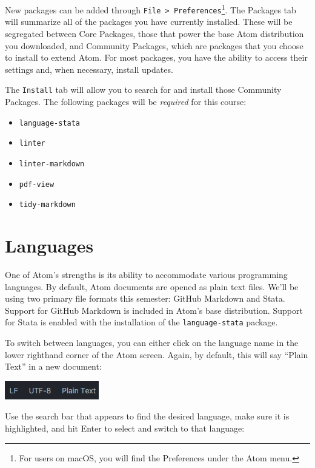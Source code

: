 \documentclass[]{book}
\providecommand{\tightlist}{%
  \setlength{\itemsep}{0pt}\setlength{\parskip}{0pt}}
\let\rmarkdownfootnote\footnote%
\def\footnote{\protect\rmarkdownfootnote}
\theoremstyle{definition}
\theoremstyle{definition}
\theoremstyle{remark}
\begin{document}
New packages can be added through
\texttt{File\ \textgreater{}\ Preferences}\footnote{For users on macOS,
  you will find the Preferences under the Atom menu.}. The Packages tab
will summarize all of the packages you have currently installed. These
will be segregated between Core Packages, those that power the base Atom
distribution you downloaded, and Community Packages, which are packages
that you choose to install to extend Atom. For most packages, you have
the ability to access their settings and, when necessary, install
updates.

The \texttt{Install} tab will allow you to search for and install those
Community Packages. The following packages will be \emph{required} for
this course:

\begin{itemize}
\tightlist
\item
  \texttt{language-stata}
\item
  \texttt{linter}
\item
  \texttt{linter-markdown}
\item
  \texttt{pdf-view}
\item
  \texttt{tidy-markdown}
\end{itemize}

\section{Languages}\label{languages}

One of Atom's strengths is its ability to accommodate various
programming languages. By default, Atom documents are opened as plain
text files. We'll be using two primary file formats this semester:
GitHub Markdown and Stata. Support for GitHub Markdown is included in
Atom's base distribution. Support for Stata is enabled with the
installation of the \texttt{language-stata} package.

To switch between languages, you can either click on the language name
in the lower righthand corner of the Atom screen. Again, by default,
this will say ``Plain Text'' in a new document:

\includegraphics[width=0.35\linewidth]{images/atomLanguages}

Use the search bar that appears to find the desired language, make sure
it is highlighted, and hit Enter to select and switch to that language:
\end{document}
